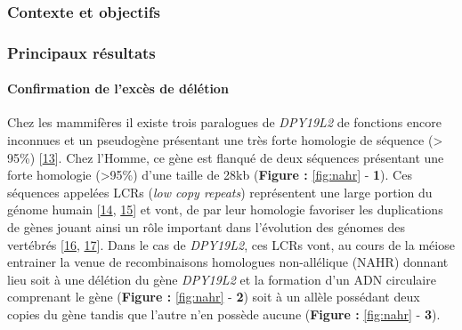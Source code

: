 \documentclass[12pt,twoside]{reedthesis}
\theoremstyle{definition}
\theoremstyle{definition}
\theoremstyle{remark}
\begin{document}
  \newpage
  
  \subsubsection{Contexte et objectifs}\label{contexte-et-objectifs}
  
  \newpage
  
  
  
  \newpage
  
  \subsubsection{Principaux résultats}\label{principaux-resultats}
  
  \paragraph{Confirmation de l'excès de
  délétion}\label{confirmation-de-lexces-de-deletion}
  
  Chez les mammifères il existe trois paralogues de \emph{DPY19L2} de
  fonctions encore inconnues et un pseudogène présentant une très forte
  homologie de séquence (\textgreater{} 95\%)
  {[}\protect\hyperlink{ref-Carson2006}{13}{]}. Chez l'Homme, ce gène est
  flanqué de deux séquences présentant une forte homologie
  (\textgreater{}95\%) d'une taille de 28kb (\textbf{Figure :
  }\ref{fig:nahr} - \textbf{1}). Ces séquences appelées LCRs (\emph{low
  copy repeats}) représentent une large portion du génome humain
  {[}\protect\hyperlink{ref-Cheung2003}{14},
  \protect\hyperlink{ref-Bailey2002}{15}{]} et vont, de par leur homologie
  favoriser les duplications de gènes jouant ainsi un rôle important dans
  l'évolution des génomes des vertébrés
  {[}\protect\hyperlink{ref-Walsh2003}{16},
  \protect\hyperlink{ref-Ohno1970}{17}{]}. Dans le cas de \emph{DPY19L2},
  ces LCRs vont, au cours de la méiose entrainer la venue de
  recombinaisons homologues non-allélique (NAHR) donnant lieu soit à une
  délétion du gène \emph{DPY19L2} et la formation d'un ADN circulaire
  comprenant le gène (\textbf{Figure : }\ref{fig:nahr} - \textbf{2}) soit
  à un allèle possédant deux copies du gène tandis que l'autre n'en
  possède aucune (\textbf{Figure : }\ref{fig:nahr} - \textbf{3}).
  
\end{document}
